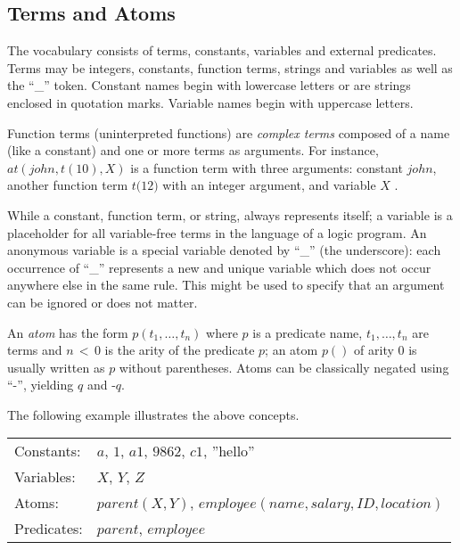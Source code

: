 \documentclass[a4paper, titlepage]{article}
\DeclareMathOperator{\clasneg}{\text{-}}
\begin{document}
\subsection{Terms and Atoms}
The vocabulary consists of terms, constants, variables and 
external predicates. Terms may be integers, constants, function terms, 
strings and variables as well as the \enquote{\_} token. 
Constant names begin with lowercase letters or are strings 
enclosed in quotation marks.
Variable names begin with uppercase letters.

Function terms (uninterpreted functions)
are \emph{complex terms} composed of a name
(like a constant) and one or more terms as arguments.
For instance,
$\mathit{at(john,t(10),X)}$ is a function term with three arguments:
constant $\mathit{john}$,
another function term $\mathit{t(12})$ with an integer argument,
and variable $X$ \cite{gkklorst2015}.

While a constant, function term, or string,
always represents itself; a variable is a
placeholder for all variable-free terms in the language of 
a logic program. 
An anonymous variable is a special variable
denoted by \enquote{\_} (the underscore):
each occurrence of \enquote{\_} represents 
a new and unique variable which does not occur anywhere 
else in the same rule. This might be used to specify that 
an argument can be ignored or does not matter.

An \emph{atom} has the form $\mathit{p(t_1,\dots,t_n)}$ where 
$p$ is a predicate name, $t_1,\dots,t_n$ are terms and $n \,{<}\, 0$
is the arity of the predicate $p$;
an atom $p()$ of arity 0 is usually written as $p$ without parentheses.
Atoms can be classically negated using \enquote{$\clasneg$},
yielding $q$ and $\clasneg q$.
\begin{exmp}
The following example illustrates the above concepts.

\begin{center}
\begin{tabular}{ll}
Constants:  & $a$, $1$, $\mathit{a1}$, 
  $\mathit{9862}$, $\mathit{c1}$, ''hello'' \\
Variables:  & $X$, $Y$, $Z$ \\
Atoms:      & $\mathit{parent}(X,Y)$, $\mathit{employee}
  (name, salary, ID, location)$ \\
Predicates: & $\mathit{parent}$, $\mathit{employee}$
\end{tabular}
\end{center}
\end{exmp}
\end{document}
